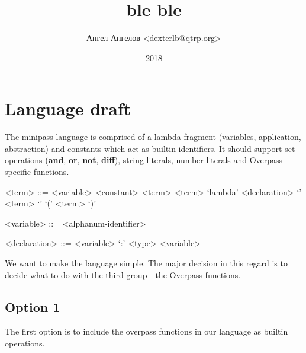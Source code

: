 \documentclass[12pt]{extarticle}
\title{ble ble}
\author{Ангел Ангелов <dexterlb@qtrp.org>}
\date{2018}
\begin{document}

\section{Language draft}
The minipass language is comprised of a lambda fragment (variables, application,
abstraction) and constants which act as builtin identifiers. It should support
set operations
(\textbf{and}, \textbf{or}, \textbf{not}, \textbf{diff}), string literals,
number literals and Overpass-specific functions.

\begin{grammar}

<term> ::= <variable>
\alt <constant>
\alt <term> <term>
\alt `lambda' <declaration> `{' <term> `}'
\alt `(' <term> `)'

<variable> ::= <alphanum-identifier>

<declaration> ::= <variable> `:' <type>
\alt <variable>

\end{grammar}

We want to make the language simple. The major decision in this regard is to
decide what to do with the third group - the Overpass functions.

\pagebreak
\subsection{Option 1}
The first option is to include the overpass functions in our language as
builtin operations.
\end{document}
